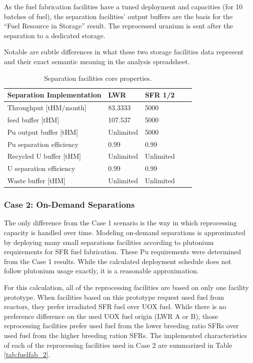 \documentclass[12pt]{article}
\begin{document}
As the fuel fabrication facilities have a tuned deployment and capacities (for
10 batches of fuel), the separation facilities' output buffers are the basis for
the ``Fuel Resource in Storage'' result.  The reprocessed uranium is sent after
the separation to a dedicated storage.

Notable are subtle differences in what these two storage facilities data represent
and their exact semantic meaning in the analysis spreadsheet.

\begin{table}[h!]
    \centering
    \begin{tabular}{lllll}
    \hline
    Separation Implementation  &  LWR        &  SFR 1/2    \\
    \hline
    Throughput [tHM/month]     &  83.3333    &  5000       \\
    feed buffer [tHM]          &  107.537    &  5000       \\
    Pu output buffer [tHM]     &  Unlimited  &  5000       \\
    Pu separation efficiency   &  0.99       &  0.99       \\
    Recycled U buffer [tHM]    &  Unlimited  &  Unlimited  \\
    U separation efficiency    &  0.99       &  0.99       \\
    Waste buffer [tHM]         &  Unlimited  &  Unlimited  \\
    \hline
    \end{tabular}
    \caption{Separation facilities core properties. }
    \label{tab:separation_1}
\end{table}

\subsubsection{Case 2: On-Demand Separations}
\label{sec:case2}

The only difference from the Case 1 scenario is the way in which reprocessing
capacity is handled over time.  Modeling on-demand separations is approximated by
deploying many small separations facilities according to plutonium requirements
for SFR fuel fabrication.  These Pu requirements were determined from the Case 1
results. While the calculated deployment schedule does not follow plutonium usage
exactly, it is a reasonable approximation.

For this calculation, all of the reprocessing facilities are based on only
one facility prototype.  When facilities based on this prototype request used fuel
from reactors, they prefer irradiated SFR fuel over UOX fuel. While there is no
preference difference on the used UOX fuel origin (LWR A or B), those
reprocessing facilities prefer used fuel from the lower breeding ratio SFRs
over used fuel from the higher breeding ration SFRs. The implemented
characteristics of each of the reprocessing facilities used in Case 2 are
summarized in Table \ref{tab:fuelfab_2}.
\end{document}
